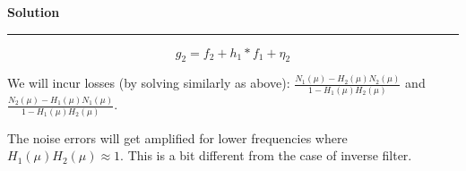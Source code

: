 \documentclass[a4paper,14pt]{article}
\newenvironment{solution}[2][]{%
    \begin{mdframed}[linecolor=blue!70!black, linewidth=2pt, roundcorner=10pt, backgroundcolor=yellow!10!white, skipabove=12pt, skipbelow=12pt]%
        \textbf{\large #2}
        \par\noindent\rule{\textwidth}{0.4pt}
}{
    \end{mdframed}
}
\begin{document}
\begin{solution}{Solution}
\begin{equation}
    g_2 = f_2 + h_1*f_1 + \eta_2
\end{equation}

We will incur losses (by solving similarly as above): $\frac{N_1(\mu)-H_2(\mu)N_2(\mu)}{1-H_1(\mu)H_2(\mu)}$ and $\frac{N_2(\mu)-H_1(\mu)N_1(\mu)}{1-H_1(\mu)H_2(\mu)}$.

The noise errors will get amplified for lower frequencies where $H_1(\mu)H_2(\mu) \approx 1$.
This is a bit different from the case of inverse filter.



\end{solution}
\end{document}
